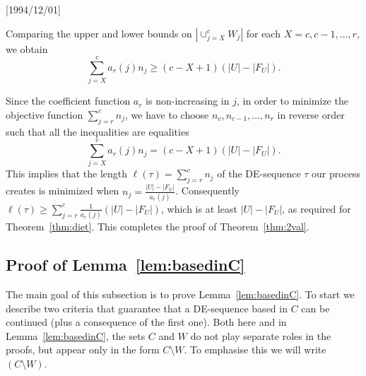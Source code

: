 \NeedsTeXFormat{LaTeX2e}[1994/12/01]\documentclass[letterpaper, 11pt]{article}
\theoremstyle{definition}
\theoremstyle{remark}
\numberwithin{equation}{section}
\begin{document}
  
Comparing the upper and lower bounds on $|\cup_{j=X}^c W_j|$ for each
$X = c, c-1 , \ldots , r$, we obtain
$$ \sum_{j=X}^c a_r(j) n_j \geq (c-X+1)(|U|-|F_U|).$$ 

Since the coefficient function $a_r$ is non-increasing in $j$,
in order to minimize the objective function $\sum_{j=r}^c n_j$, we
have to choose $n_c, n_{c-1}, \ldots , n_r$  in reverse order such
that all the inequalities are equalities
$$ \sum_{j=X}^c a_r(j) n_j = (c-X+1)(|U|-|F_U|).$$
This implies that the length $\ell(\tau) = \sum_{j=r}^c n_j$ of the
DE-sequence $\tau$ our process creates is minimized when
$n_j = \frac{|U|-|F_U|}{a_r(j)}$. Consequently
$\ell(\tau) \geq \sum_{j=r}^c \frac{1}{a_r(j)} (|U| -|F_U|)$, which is 
at least $|U| -|F_U|$, as required for Theorem~\ref{thm:diet}. 
This completes the proof of Theorem~\ref{thm:2val}.







\subsection{Proof of Lemma~\ref{lem:basedinC}}\label{sec:shortDE}

The main goal of this subsection is to prove Lemma~\ref{lem:basedinC}. 
To start we describe two criteria that guarantee that a DE-sequence based in $C$ can be continued (plus a consequence of the first one). Both here and in Lemma~\ref{lem:basedinC}, the sets $C$ and $W$ do not play separate roles in the proofs, but appear only in the form $C\setminus W$. To emphasise this we will write $(C\setminus W)$.
\end{document}
